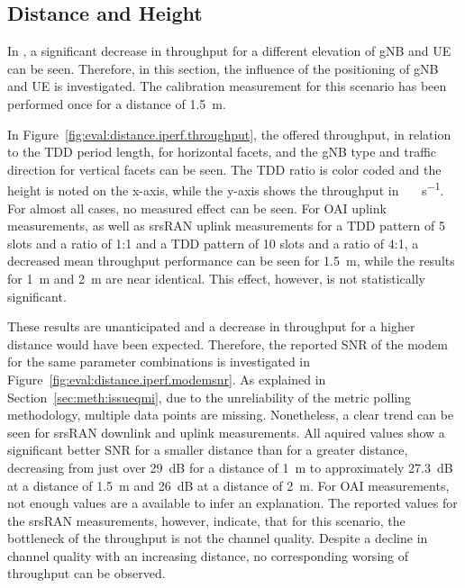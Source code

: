 \subsection{Distance and Height}\label{sec:eval:positioning}

In \cite{raffeck2024parameterizing}, a significant decrease in throughput for a different elevation of \gls{gNB} and
\gls{UE} can be seen.
Therefore, in this section, the influence of the positioning of \gls{gNB} and \gls{UE} is investigated.
The calibration measurement for this scenario has been performed once for a distance of \SI{1.5}{\meter}.

In Figure~\ref{fig:eval:distance.iperf.throughput}, the offered throughput, in relation to the \gls{TDD} period length,
for horizontal facets, and the \gls{gNB} type and traffic direction for vertical facets can be seen.
The \gls{TDD} ratio is color coded and the height is noted on the x-axis, while the y-axis shows the throughput in \SI{}{\mega\bit\per\second}.
For almost all cases, no measured effect can be seen.
For OAI uplink measurements, as well as srsRAN uplink measurements for a \gls{TDD} pattern of 5 slots and a ratio
of 1:1 and a \gls{TDD} pattern of 10 slots and a ratio of 4:1, a decreased mean throughput performance can be seen
for \SI{1.5}{\meter}, while the results for \SI{1}{\meter} and \SI{2}{\meter} are near identical.
This effect, however, is not statistically significant.

These results are unanticipated and a decrease in throughput for a higher distance would have been expected.
Therefore, the reported \gls{SNR} of the modem for the same parameter combinations is investigated in Figure~\ref{fig:eval:distance.iperf.modemsnr}.
As explained in Section~\ref{sec:meth:issueqmi}, due to the unreliability of the metric polling methodology, multiple data points are missing.
Nonetheless, a clear trend can be seen for srsRAN downlink and uplink measurements.
All aquired values show a significant better \gls{SNR} for a smaller distance than for a greater distance,
decreasing from just over \SI{29}{\deci\bel} for a distance of \SI{1}{\meter} to approximately \SI{27.3}{\deci\bel}
at a distance of \SI{1.5}{\meter} and \SI{26}{\deci\bel} at a distance of \SI{2}{\meter}.
For OAI measurements, not enough values are a available to infer an explanation.
The reported values for the srsRAN measurements, however, indicate, that for this scenario, the bottleneck of the throughput is not the channel quality.
Despite a decline in channel quality with an increasing distance, no corresponding worsing of throughput can be observed.


